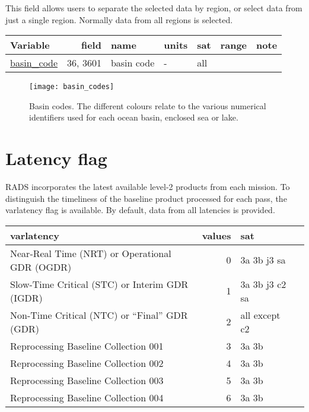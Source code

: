 \documentclass[a4paper,11pt,openany,natbib,nomargin]{thesis}
\makeatletter
\newcommand\var[1]{\url{#1}\index{variables!#1@\protect\url{#1}}}
\newenvironment{vartable}{
\begin{table}[ht]
\small
\begin{tabular}{lrllllr}
\hline
Variable & field & name & units & sat & range & note \\
\hline
}{
\hline
\end{tabular}
\end{table}
}
\makeatother
\begin{document}
This field allows users to separate the selected data by region, or select data from just a single region. Normally data from all regions is selected.

\begin{vartable}
\var{basin_code} & 36, 3601 & basin code & - & all && \\
\end{vartable}

\begin{figure}
\texttt{[image: basin\_codes]}
\caption{Basin codes. The different colours relate to the various numerical identifiers used for each ocean basin, enclosed sea or lake.}
\label{fig:basin_codes}
\end{figure}

\section{Latency flag}
RADS incorporates the latest available level-2 products from each mission. To distinguish the timeliness of the baseline product processed for each pass, the var{latency} flag is available. By default, data from all latencies is provided.

\begin{table}
\small
\begin{tabular}{lr}
\hline
var{latency} & values & sat \\
\hline
Near-Real Time (NRT) or Operational GDR (OGDR) & 0 & 3a 3b j3 sa && \\
Slow-Time Critical (STC) or Interim GDR (IGDR) & 1 & 3a 3b j3 c2 sa && \\
Non-Time Critical (NTC) or ``Final'' GDR (GDR) & 2 & all except c2 && \\
Reprocessing Baseline Collection 001 & 3 & 3a 3b && \\
Reprocessing Baseline Collection 002 & 4 & 3a 3b && \\
Reprocessing Baseline Collection 003 & 5 & 3a 3b && \\
Reprocessing Baseline Collection 004 & 6 & 3a 3b && \\
\hline
\end{tabular}
\end{table}


\printindex
\end{document}
